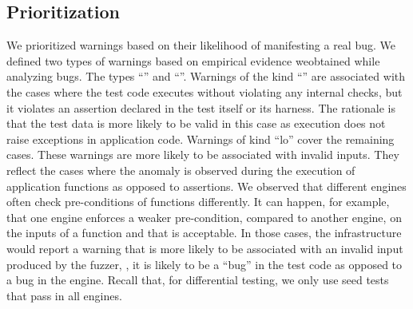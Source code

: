 \documentclass[smallextended]{svjour3}
\begin{document}



\subsection{Prioritization}
\label{sec:prioritization}

We prioritized warnings based on their likelihood of manifesting a
real bug. We defined two types of warnings based on empirical evidence
weobtained while analyzing bugs. The types ``\hi{}'' and
``\lo{}''. Warnings of the kind ``\hi{}'' are associated with the
cases where the test code executes without violating any internal
checks, but it violates an assertion declared in the test itself or
its harness. The rationale is that the test data is more likely to be
valid in this case as execution does not raise exceptions in
application code. Warnings of kind ``lo'' cover the remaining
cases. These warnings are more likely to be associated with invalid
inputs. They reflect the cases where the anomaly is observed during
the execution of application functions as opposed to assertions. We
observed that different engines often check pre-conditions of
functions differently. It can happen, for example, that one engine
enforces a weaker pre-condition, compared to another engine, on the
inputs of a function and that is acceptable. In those cases,
the infrastructure would report a warning that is more likely to be
associated with an invalid input produced by the fuzzer, \ie{}, it is
likely to be a ``bug'' in the test code as opposed to a bug in the
engine. Recall that, for differential testing, we only use seed tests
that pass in all engines.
\end{document}

